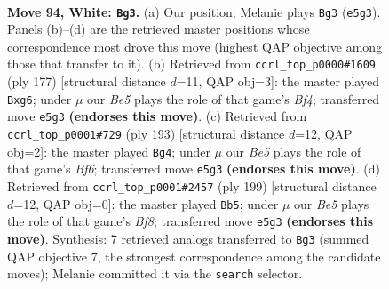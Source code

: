\documentclass[11pt]{article}
\begin{document}
\clearpage

\begin{figure}[p]\centering
\begin{subfigure}{0.46\textwidth}\centering
\resizebox{\linewidth}{!}{%
\newchessgame
\chessboard[
  setfen={6k1/2P5/8/4B3/8/2K5/8/8 w - - 13 94},
  showmover=false,
  pgfstyle=straightmove, color=movearrow, markmove={e5-g3}
]}
\caption{}
\end{subfigure}\hfill
\begin{subfigure}{0.46\textwidth}\centering
\resizebox{\linewidth}{!}{%
\newchessgame
\chessboard[
  setfen={8/3k4/6P1/5b2/8/8/8/B1K5 b - - 2 89},
  showmover=false,
  pgfstyle=straightmove, color=movearrow, markmove={f5-g6}
]}
\caption{}
\end{subfigure}
\\[4pt]
\begin{subfigure}{0.46\textwidth}\centering
\resizebox{\linewidth}{!}{%
\newchessgame
\chessboard[
  setfen={8/8/5K2/3k3p/7P/4Rb2/8/8 b - - 50 97},
  showmover=false,
  pgfstyle=straightmove, color=movearrow, markmove={f3-g4}
]}
\caption{}
\end{subfigure}\hfill
\begin{subfigure}{0.46\textwidth}\centering
\resizebox{\linewidth}{!}{%
\newchessgame
\chessboard[
  setfen={4k3/8/p7/P7/8/2K5/7B/5b2 b - - 7 100},
  showmover=false,
  pgfstyle=straightmove, color=movearrow, markmove={f1-b5}
]}
\caption{}
\end{subfigure}
\caption{\textbf{Move 94, White: \texttt{Bg3}.} (a) Our position; Melanie plays \texttt{Bg3} (\texttt{e5g3}). Panels (b)--(d) are the retrieved master positions whose correspondence most drove this move (highest QAP objective among those that transfer to it). (b) Retrieved from \texttt{ccrl\_top\_p0000\#1609} (ply 177) [structural distance $d$=11, QAP obj=3]: the master played \texttt{Bxg6}; under $\mu$ our \emph{Be5} plays the role of that game's \emph{Bf4}; transferred move \texttt{e5g3} \textbf{(endorses this move)}. (c) Retrieved from \texttt{ccrl\_top\_p0001\#729} (ply 193) [structural distance $d$=12, QAP obj=2]: the master played \texttt{Bg4}; under $\mu$ our \emph{Be5} plays the role of that game's \emph{Bf6}; transferred move \texttt{e5g3} \textbf{(endorses this move)}. (d) Retrieved from \texttt{ccrl\_top\_p0001\#2457} (ply 199) [structural distance $d$=12, QAP obj=0]: the master played \texttt{Bb5}; under $\mu$ our \emph{Be5} plays the role of that game's \emph{Bf8}; transferred move \texttt{e5g3} \textbf{(endorses this move)}. Synthesis: 7 retrieved analogs transferred to \texttt{Bg3} (summed QAP objective 7, the strongest correspondence among the candidate moves); Melanie committed it via the \texttt{search} selector.}
\label{fig:thought-m186}
\end{figure}
\end{document}
